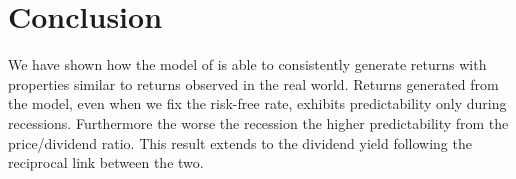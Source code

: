 \section{Conclusion} \label{sec:Conclusion}
We have shown how the model of \citet{Campbell1999} is able to consistently generate returns with properties similar to returns observed in the real world. Returns generated from the model, even when we fix the risk-free rate, exhibits predictability only during recessions. Furthermore the worse the recession the higher predictability from the price/dividend ratio. This result extends to the dividend yield following the reciprocal link between the two. 



\begin{comment}
While not telling us much about the empirical US-economy we have shown that by using a very simple regime-switching model when predicting future returns, the \citet{Campbell1999}-model is able to generate data with properties similar to the behavior of real-world stock returns. That is the predictability of stock returns are almost non-existent when examining expansionary periods, and much more predictable when examining recession-periods even when the underlying data-generating process is exactly the same. \\
However the result does not seem to be robust when the recession chain is unknown or poorly estimated, this makes the results difficult to exploit for profit for a typical investor.

Thus if the \citet{Campbell1999}-model is indeed a good approximation of the true underlying data-generating process of stock returns, our results shows that if one were able to consistently predict business-cycle variation, one could exploit the fact that stock returns are predictable during recessions while diminishing entering expansions. This piece of information would indeed be of value to the typical mean-variance investor.\\
The more pressing fact is that the economy is seldom in recession, only around 14\% of the post-war period, and thus the results implies that only in 14\% of the post-war periods returns are actually predictable, while in the remaining 86\% periods stocks are essentially a much riskier 50/50 gamble.
\end{comment}